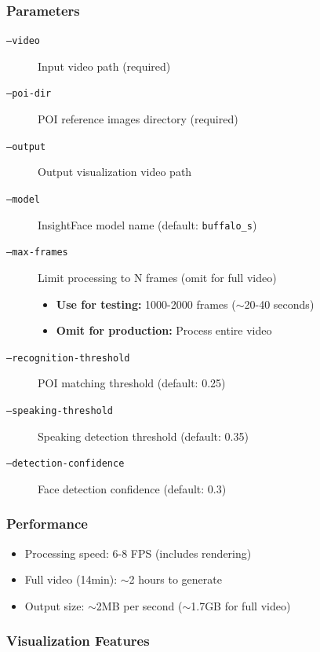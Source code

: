 \documentclass[11pt,a4paper]{article}
\begin{document}
\subsubsection{Parameters}

\begin{description}
    \item[\texttt{--video}] Input video path (required)
    \item[\texttt{--poi-dir}] POI reference images directory (required)
    \item[\texttt{--output}] Output visualization video path
    \item[\texttt{--model}] InsightFace model name (default: \texttt{buffalo\_s})
    \item[\texttt{--max-frames}] Limit processing to N frames (omit for full video)
    \begin{itemize}
        \item \textbf{Use for testing:} 1000-2000 frames ($\sim$20-40 seconds)
        \item \textbf{Omit for production:} Process entire video
    \end{itemize}
    \item[\texttt{--recognition-threshold}] POI matching threshold (default: 0.25)
    \item[\texttt{--speaking-threshold}] Speaking detection threshold (default: 0.35)
    \item[\texttt{--detection-confidence}] Face detection confidence (default: 0.3)
\end{description}

\subsubsection{Performance}

\begin{itemize}
    \item Processing speed: 6-8 FPS (includes rendering)
    \item Full video (14min): $\sim$2 hours to generate
    \item Output size: $\sim$2MB per second ($\sim$1.7GB for full video)
\end{itemize}

\subsubsection{Visualization Features}
\end{document}
